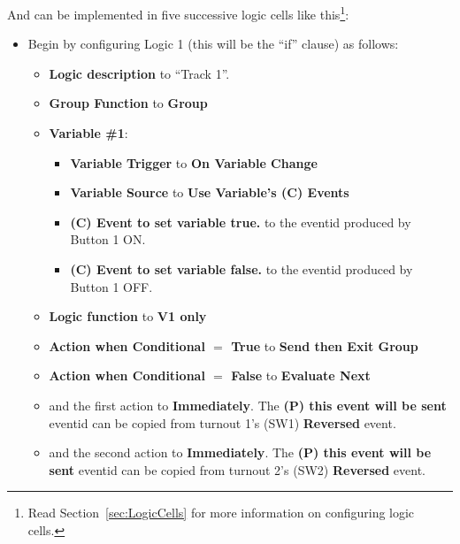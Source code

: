 And can be implemented in five successive logic cells like this\footnote{Read 
Section~\ref{sec:LogicCells} for more information on configuring logic cells.}:

\begin{itemize}
\item Begin by configuring Logic 1 (this will be the ``if'' clause) as
follows:
\begin{itemize}
\item \textbf{Logic description} to ``Track 1''.
\item \textbf{Group Function} to \textbf{Group}
\item \textbf{Variable \#1}:
\begin{itemize}
\item \textbf{Variable Trigger} to \textbf{On Variable Change}
\item \textbf{Variable Source} to \textbf{Use Variable's (C) Events}
\item \textbf{(C) Event to set variable true.} to the eventid produced by 
Button 1 ON.
\item \textbf{(C) Event to set variable false.} to the eventid produced by 
Button 1 OFF.
\end{itemize}
\item \textbf{Logic function} to \textbf{V1 only}
\item \textbf{Action when Conditional $=$ True} to \textbf{Send then Exit 
Group}
\item \textbf{Action when Conditional $=$ False} to \textbf{Evaluate Next}
\item and the first action to \textbf{Immediately}.  The \textbf{(P) this 
event will be sent} eventid can be copied from turnout 1's (SW1) 
\textbf{Reversed} event.
\item and the second action to \textbf{Immediately}.  The \textbf{(P) this 
event will be sent} eventid can be copied from turnout 2's (SW2) 
\textbf{Reversed} event.
\end{itemize}


\end{itemize}
